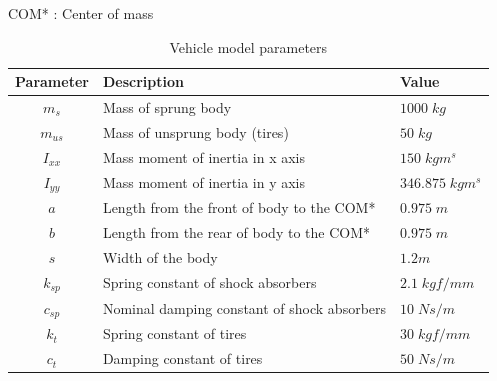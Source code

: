   \begin{table}[ht!]
    \caption{Vehicle model parameters}
    \label{table:full_car_parameters}
    \small%
    {\raggedright COM* : Center of mass \par}
    \centering%
    \begin{tabular}{cll}
      \toprule
      Parameter& Description  & Value \\
      \midrule
      $m_s$    & Mass of sprung body   & $1000\;kg$ \\
      \midrule
      $m_{us}$ & Mass of unsprung body (tires) & $50\;kg$ \\
      \midrule
      $I_{xx}$ & Mass moment of inertia in x axis             & $150 \;kg m^s$ \\
      \midrule
      $I_{yy}$ & Mass moment of inertia in y axis             & $346.875\; kg m^s$ \\
      \midrule
      $a$      & Length from the front of body to the COM* & $0.975 \; m$ \\
      \midrule
      $b$      & Length from the rear of body to the COM* & $0.975 \; m$ \\
      \midrule
      $s$      & Width of the body & $1.2 m$ \\
      \midrule
      $k_{sp}$ & Spring constant of shock absorbers & $2.1\;kgf/mm$ \\
      \midrule
      $c_{sp}$ & Nominal damping constant of shock absorbers & $10\;Ns/m$ \\
      \midrule
      $k_{t}$  & Spring constant of tires & $30\;kgf/mm$ \\
      \midrule
      $c_{t}$  & Damping constant of tires & $50\;Ns/m$ \\
      \bottomrule
    \end{tabular}
  
  \end{table}